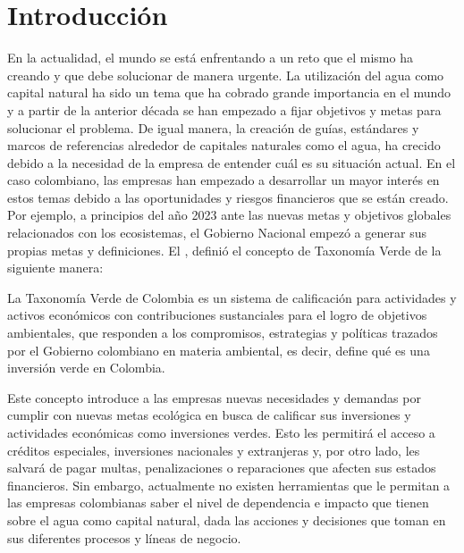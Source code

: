 \section{Introducción}
\label{sec:introduccion}
En la actualidad, el mundo se está enfrentando a un reto que el mismo ha creando y que debe solucionar de manera urgente. La utilización del agua como capital natural ha sido un tema que ha cobrado grande importancia en el mundo y a partir de la anterior década se han empezado a fijar objetivos y metas para solucionar el problema. De igual manera, la creación de guías, estándares y marcos de referencias alrededor de capitales naturales como el agua, ha crecido debido a la necesidad de la empresa de entender cuál es su situación actual. En el caso colombiano, las empresas han empezado a desarrollar un mayor interés en estos temas debido a las oportunidades y riesgos financieros que se están creado.  Por ejemplo, a principios del año 2023 ante las nuevas metas y objetivos globales relacionados con los ecosistemas, el Gobierno Nacional empezó a generar sus propias metas y definiciones. El \textcite{ministerio-de-hacienda-2023}, definió el concepto de Taxonomía Verde de la siguiente manera:

\hfill
\par
\leftskip=0.35in \rightskip=0.35in
La Taxonomía Verde de Colombia es un sistema de calificación para actividades y activos económicos con contribuciones sustanciales para el logro de objetivos ambientales, que responden a los compromisos, estrategias y políticas trazados por el Gobierno colombiano en materia ambiental, es decir, define qué es una inversión verde en Colombia.

\hfill
\par
\leftskip=0in \rightskip=0in
Este concepto introduce a las empresas nuevas necesidades y demandas por cumplir con nuevas metas ecológica en busca de calificar sus inversiones y actividades económicas como inversiones verdes. Esto les permitirá el acceso a créditos especiales, inversiones nacionales y extranjeras y, por otro lado, les salvará de pagar multas, penalizaciones o reparaciones que afecten sus estados financieros. Sin embargo, actualmente no existen herramientas que le permitan a las empresas colombianas saber el nivel de dependencia e impacto que tienen sobre el agua como capital natural, dada las acciones y decisiones que toman en sus diferentes procesos y líneas de negocio.

\hfill

